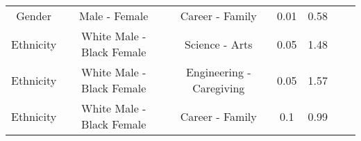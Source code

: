 \documentclass{article}%
\begin{document}
\begin{table}[t]
\begin{tabular}{c|cccccc}
         Gender & Male - Female & Career - Family & 0.01 & 0.58 \\
         Ethnicity & White Male - Black Female & Science - Arts & 0.05 & 1.48 \\
         Ethnicity & White Male - Black Female & Engineering - Caregiving & 0.05 & 1.57 \\
         Ethnicity & White Male - Black Female & Career - Family & 0.1 & 0.99 \\
        \end{tabular}
    \label{tab:iEAT_Clip}
\end{table}
\end{document}
